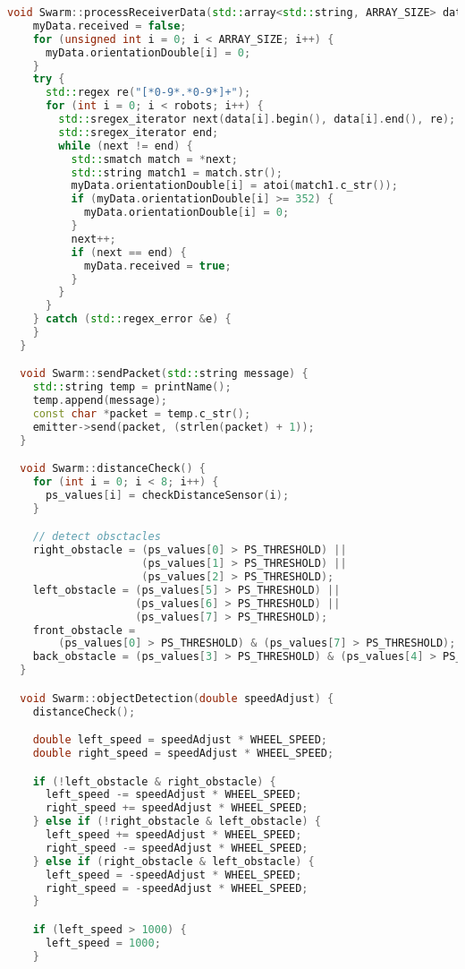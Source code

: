 \begin{lstlisting}[language=C++, caption={swarm.cpp},label={lst:swarm-header}]
  void Swarm::processReceiverData(std::array<std::string, ARRAY_SIZE> data) {
    myData.received = false;
    for (unsigned int i = 0; i < ARRAY_SIZE; i++) {
      myData.orientationDouble[i] = 0;
    }
    try {
      std::regex re("[*0-9*.*0-9*]+");
      for (int i = 0; i < robots; i++) {
        std::sregex_iterator next(data[i].begin(), data[i].end(), re);
        std::sregex_iterator end;
        while (next != end) {
          std::smatch match = *next;
          std::string match1 = match.str();
          myData.orientationDouble[i] = atoi(match1.c_str());
          if (myData.orientationDouble[i] >= 352) {
            myData.orientationDouble[i] = 0;
          }
          next++;
          if (next == end) {
            myData.received = true;
          }
        }
      }
    } catch (std::regex_error &e) {
    }
  }

  void Swarm::sendPacket(std::string message) {
    std::string temp = printName();
    temp.append(message);
    const char *packet = temp.c_str();
    emitter->send(packet, (strlen(packet) + 1));
  }

  void Swarm::distanceCheck() {
    for (int i = 0; i < 8; i++) {
      ps_values[i] = checkDistanceSensor(i);
    }

    // detect obsctacles
    right_obstacle = (ps_values[0] > PS_THRESHOLD) ||
                     (ps_values[1] > PS_THRESHOLD) ||
                     (ps_values[2] > PS_THRESHOLD);
    left_obstacle = (ps_values[5] > PS_THRESHOLD) ||
                    (ps_values[6] > PS_THRESHOLD) ||
                    (ps_values[7] > PS_THRESHOLD);
    front_obstacle =
        (ps_values[0] > PS_THRESHOLD) & (ps_values[7] > PS_THRESHOLD);
    back_obstacle = (ps_values[3] > PS_THRESHOLD) & (ps_values[4] > PS_THRESHOLD);
  }

  void Swarm::objectDetection(double speedAdjust) {
    distanceCheck();

    double left_speed = speedAdjust * WHEEL_SPEED;
    double right_speed = speedAdjust * WHEEL_SPEED;

    if (!left_obstacle & right_obstacle) {
      left_speed -= speedAdjust * WHEEL_SPEED;
      right_speed += speedAdjust * WHEEL_SPEED;
    } else if (!right_obstacle & left_obstacle) {
      left_speed += speedAdjust * WHEEL_SPEED;
      right_speed -= speedAdjust * WHEEL_SPEED;
    } else if (right_obstacle & left_obstacle) {
      left_speed = -speedAdjust * WHEEL_SPEED;
      right_speed = -speedAdjust * WHEEL_SPEED;
    }

    if (left_speed > 1000) {
      left_speed = 1000;
    }


\end{lstlisting}
